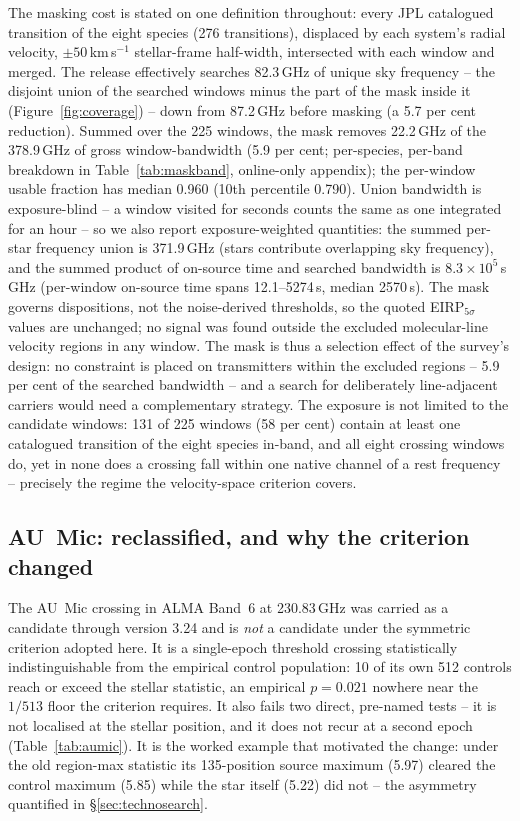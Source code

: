 \documentclass{openjournal}
\begin{document}
The masking cost is stated on one definition throughout: every JPL
catalogued transition of the eight species (276 transitions),
displaced by each system's radial velocity, $\pm50$\,km\,s$^{-1}$
stellar-frame half-width, intersected with each window and merged.
The release effectively searches 82.3\,GHz of unique sky frequency --
the disjoint union of the searched windows minus the part of the mask
inside it (Figure~\ref{fig:coverage}) -- down from 87.2\,GHz before
masking (a 5.7 per cent reduction). Summed over the 225 windows, the
mask removes 22.2\,GHz of the 378.9\,GHz of gross window-bandwidth
(5.9 per cent; per-species, per-band breakdown in
Table~\ref{tab:maskband}, online-only appendix); the per-window
usable fraction has median 0.960 (10th percentile 0.790). Union
bandwidth is exposure-blind -- a window visited for seconds counts
the same as one integrated for an hour -- so we also report
exposure-weighted quantities: the summed per-star frequency union is
371.9\,GHz (stars contribute overlapping sky frequency), and the
summed product of on-source time and searched bandwidth is
$8.3\times10^{5}$\,s\,GHz (per-window on-source time spans
12.1--5274\,s, median 2570\,s). The mask governs dispositions, not the
noise-derived thresholds, so the quoted EIRP$_{5\sigma}$ values are
unchanged; no signal was found outside the excluded molecular-line
velocity regions in any window. The mask is thus a selection effect
of the survey's design: no constraint is placed on transmitters
within the excluded regions -- 5.9 per cent of the searched bandwidth
-- and a search for deliberately line-adjacent carriers would need a
complementary strategy. The exposure is not limited to the candidate
windows: 131 of 225 windows (58 per cent) contain at least one
catalogued transition of the eight species in-band, and all eight
crossing windows do, yet in none does a crossing fall within one
native channel of a rest frequency -- precisely the regime the
velocity-space criterion covers.

\subsection{AU~Mic: reclassified, and why the criterion changed}
\label{sec:aumic}

The AU~Mic crossing in ALMA Band~6 at 230.83\,GHz was carried as a
candidate through version 3.24 and is \emph{not} a candidate under
the symmetric criterion adopted here. It is a single-epoch threshold
crossing statistically indistinguishable from the empirical control
population: 10 of its own 512 controls reach or exceed the stellar
statistic, an empirical $p=0.021$ nowhere near the $1/513$ floor the
criterion requires. It also fails two direct, pre-named tests -- it
is not localised at the stellar position, and it does not recur at a
second epoch (Table~\ref{tab:aumic}). It is the worked example that
motivated the change: under the old region-max statistic its
135-position source maximum (5.97) cleared the control maximum (5.85)
while the star itself (5.22) did not -- the asymmetry quantified in
\S\ref{sec:technosearch}.
\end{document}
